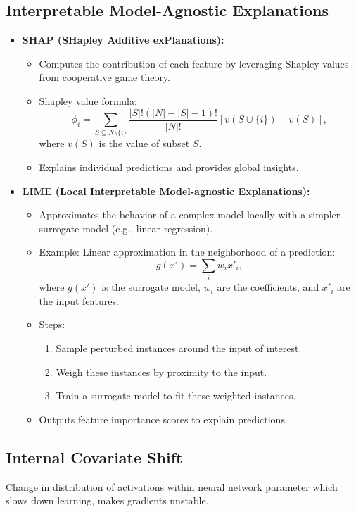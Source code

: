 \documentclass[12pt,a4paper]{article}
\begin{document}
\subsection{Interpretable Model-Agnostic Explanations}
\begin{itemize}
    \item \textbf{SHAP (SHapley Additive exPlanations):}
    \begin{itemize}
        \item Computes the contribution of each feature by leveraging Shapley values from cooperative game theory.
        \item Shapley value formula:
        \[ \phi_i = \sum_{S \subseteq N \setminus \{i\}} \frac{|S|! (|N| - |S| - 1)!}{|N|!} \left[v(S \cup \{i\}) - v(S)\right], \]
        where $v(S)$ is the value of subset $S$.
        \item Explains individual predictions and provides global insights.
    \end{itemize}
    \item \textbf{LIME (Local Interpretable Model-agnostic Explanations):}
    \begin{itemize}
        \item Approximates the behavior of a complex model locally with a simpler surrogate model (e.g., linear regression).
    \item Example: Linear approximation in the neighborhood of a prediction:
    \[ g(x') = \sum_i w_i x'_i, \]
    where $g(x')$ is the surrogate model, $w_i$ are the coefficients, and $x'_i$ are the input features.
        \item Steps:
        \begin{enumerate}
            \item Sample perturbed instances around the input of interest.
            \item Weigh these instances by proximity to the input.
            \item Train a surrogate model to fit these weighted instances.
        \end{enumerate}
        \item Outputs feature importance scores to explain predictions.
    \end{itemize}
\end{itemize}
\subsection{Internal Covariate Shift}
Change in distribution of activations within neural network parameter which slows down learning, makes gradients unstable.
\end{document}

